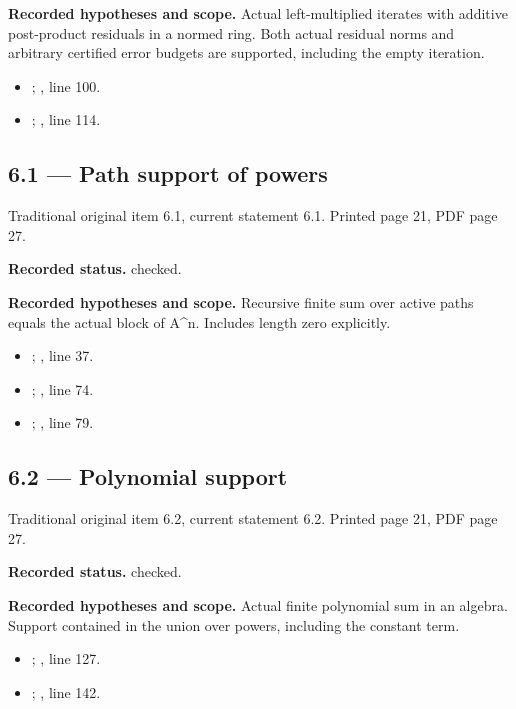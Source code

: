 \textbf{Recorded hypotheses and scope.} Actual left-multiplied iterates with additive post-product residuals in a normed ring. Both actual residual norms and arbitrary certified error budgets are supported, including the empty iteration.

\begin{itemize}
\item {}; , line 100.
\item {}; , line 114.
\end{itemize}
\subsection{6.1 — Path support of powers}
\label{result:6.1}
{\footnotesize\color{muted}Traditional original item 6.1, current statement 6.1. Printed page 21, PDF page 27.}\par
\textbf{Recorded status.} checked.

\textbf{Recorded hypotheses and scope.} Recursive finite sum over active paths equals the actual block of A\textasciicircum{}n. Includes length zero explicitly.

\begin{itemize}
\item {}; , line 37.
\item {}; , line 74.
\item {}; , line 79.
\end{itemize}
\subsection{6.2 — Polynomial support}
\label{result:6.2}
{\footnotesize\color{muted}Traditional original item 6.2, current statement 6.2. Printed page 21, PDF page 27.}\par
\textbf{Recorded status.} checked.

\textbf{Recorded hypotheses and scope.} Actual finite polynomial sum in an algebra. Support contained in the union over powers, including the constant term.

\begin{itemize}
\item {}; , line 127.
\item {}; , line 142.
\end{itemize}
